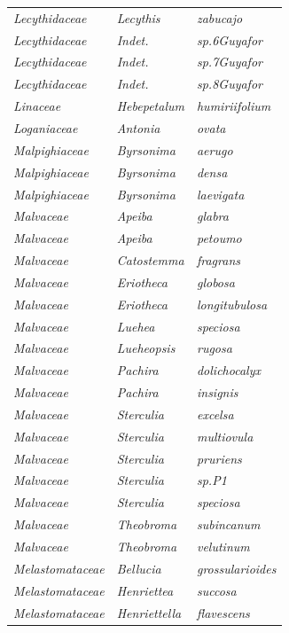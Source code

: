 \documentclass[fleqn,10pt]{ArtEcoFoG} %
\begin{document}
\begin{table}[t]
\begin{tabular}{lll}
\addlinespace
\em{Lecythidaceae} & \em{Lecythis} & \em{zabucajo}\\
\em{Lecythidaceae} & \em{Indet.} & \em{sp.6Guyafor}\\
\em{Lecythidaceae} & \em{Indet.} & \em{sp.7Guyafor}\\
\em{Lecythidaceae} & \em{Indet.} & \em{sp.8Guyafor}\\
\em{Linaceae} & \em{Hebepetalum} & \em{humiriifolium}\\
\addlinespace
\em{Loganiaceae} & \em{Antonia} & \em{ovata}\\
\em{Malpighiaceae} & \em{Byrsonima} & \em{aerugo}\\
\em{Malpighiaceae} & \em{Byrsonima} & \em{densa}\\
\em{Malpighiaceae} & \em{Byrsonima} & \em{laevigata}\\
\em{Malvaceae} & \em{Apeiba} & \em{glabra}\\
\addlinespace
\em{Malvaceae} & \em{Apeiba} & \em{petoumo}\\
\em{Malvaceae} & \em{Catostemma} & \em{fragrans}\\
\em{Malvaceae} & \em{Eriotheca} & \em{globosa}\\
\em{Malvaceae} & \em{Eriotheca} & \em{longitubulosa}\\
\em{Malvaceae} & \em{Luehea} & \em{speciosa}\\
\addlinespace
\em{Malvaceae} & \em{Lueheopsis} & \em{rugosa}\\
\em{Malvaceae} & \em{Pachira} & \em{dolichocalyx}\\
\em{Malvaceae} & \em{Pachira} & \em{insignis}\\
\em{Malvaceae} & \em{Sterculia} & \em{excelsa}\\
\em{Malvaceae} & \em{Sterculia} & \em{multiovula}\\
\addlinespace
\em{Malvaceae} & \em{Sterculia} & \em{pruriens}\\
\em{Malvaceae} & \em{Sterculia} & \em{sp.P1}\\
\em{Malvaceae} & \em{Sterculia} & \em{speciosa}\\
\em{Malvaceae} & \em{Theobroma} & \em{subincanum}\\
\em{Malvaceae} & \em{Theobroma} & \em{velutinum}\\
\addlinespace
\em{Melastomataceae} & \em{Bellucia} & \em{grossularioides}\\
\em{Melastomataceae} & \em{Henriettea} & \em{succosa}\\
\em{Melastomataceae} & \em{Henriettella} & \em{flavescens}\\

\end{tabular}
\end{table}
\end{document}
